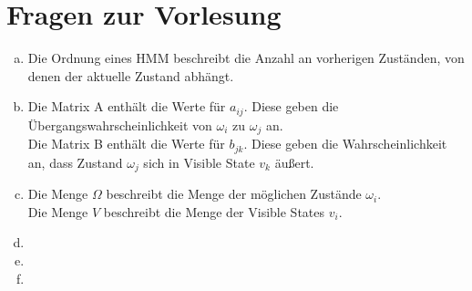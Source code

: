 \documentclass[a4paper]{scrartcl}
\begin{document}
\section{Fragen zur Vorlesung}

\begin{enumerate}[(a)]
	\item Die Ordnung eines HMM beschreibt die Anzahl an vorherigen Zuständen, von denen der aktuelle Zustand abhängt.
	
	\item Die Matrix A enthält die Werte für $a_{ij}$. Diese geben die Übergangswahrscheinlichkeit von $\omega_i$ zu $\omega_j$ an.\\
	
	Die Matrix B enthält die Werte für $b_{jk}$. Diese geben die Wahrscheinlichkeit an, dass Zustand $\omega_j$ sich in Visible State $v_k$ äußert.\\
	
	\item Die Menge $\Omega$ beschreibt die Menge der möglichen Zustände $\omega_i$.\\
	
	Die Menge $V$ beschreibt die Menge der Visible States $v_i$.
	\item 
	\item 
	\item 
\end{enumerate}
\end{document}
